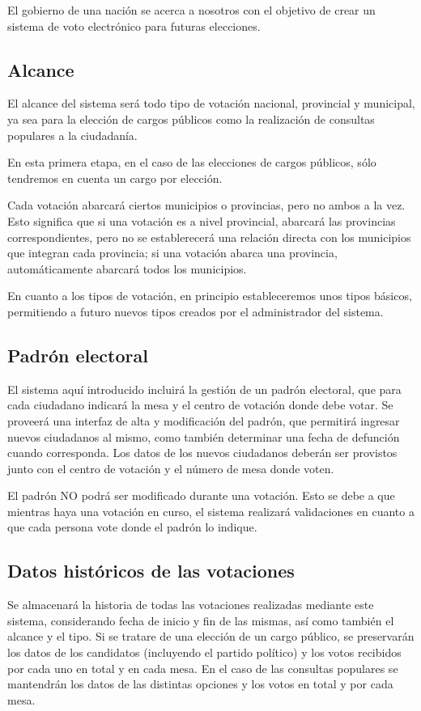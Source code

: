 El gobierno de una nación se acerca a nosotros con el objetivo de crear un sistema de voto electrónico para futuras elecciones.

\subsection{Alcance}
El alcance del sistema será todo tipo de votación nacional, provincial y municipal,
ya sea para la elección de cargos públicos como la realización de consultas populares a la ciudadanía.

En esta primera etapa, en el caso de las elecciones de cargos públicos, sólo tendremos en cuenta un cargo por elección.

Cada votación abarcará ciertos municipios o provincias, pero no ambos a la vez. Esto significa que si una votación es
a nivel provincial, abarcará las provincias correspondientes, pero no se establerecerá una relación directa con los
municipios que integran cada provincia; si una votación abarca una provincia, automáticamente abarcará todos los municipios.

En cuanto a los tipos de votación, en principio estableceremos unos tipos básicos, permitiendo a futuro nuevos
tipos creados por el administrador del sistema.

\subsection{Padrón electoral}
El sistema aquí introducido incluirá la gestión de un padrón electoral, 
que para cada ciudadano indicará la mesa y el centro de votación donde debe votar. Se proveerá una interfaz de alta
y modificación del padrón, que permitirá ingresar nuevos ciudadanos al mismo, como también determinar una fecha de
defunción cuando corresponda. Los datos de los nuevos ciudadanos deberán ser provistos junto con el centro de votación 
y el número de mesa donde voten.

El padrón NO podrá ser modificado durante una votación. Esto se debe a que mientras haya una votación en curso,
el sistema realizará validaciones en cuanto a que cada persona vote donde el padrón lo indique.

\subsection{Datos históricos de las votaciones}
Se almacenará la historia de todas las votaciones realizadas mediante este sistema, considerando fecha de inicio y fin de las mismas,
así como también el alcance y el tipo. Si se tratare de una elección de un cargo público, se preservarán los datos de los candidatos 
(incluyendo el partido político) y los votos recibidos por cada uno en total y en cada mesa. En el caso de las consultas populares se
mantendrán los datos de las distintas opciones y los votos en total y por cada mesa.

